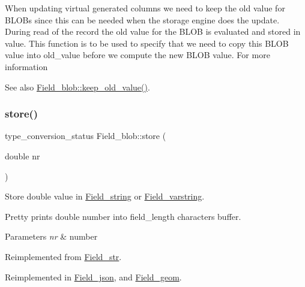 When updating virtual generated columns we need to keep the old \textquotesingle{}value\textquotesingle{} for B\+L\+O\+Bs since this can be needed when the storage engine does the update. During read of the record the old \textquotesingle{}value\textquotesingle{} for the B\+L\+OB is evaluated and stored in \textquotesingle{}value\textquotesingle{}. This function is to be used to specify that we need to copy this B\+L\+OB \textquotesingle{}value\textquotesingle{} into \textquotesingle{}old\+\_\+value\textquotesingle{} before we compute the new B\+L\+OB \textquotesingle{}value\textquotesingle{}. For more information \begin{DoxySeeAlso}{See also}
\mbox{\hyperlink{classField__blob_ac227ff512cca0c54fb2942fffb00e4ca}{Field\+\_\+blob\+::keep\+\_\+old\+\_\+value()}}. 
\end{DoxySeeAlso}
\mbox{\label{classField__blob_a2bc7bea5075f5ebbee1a11c13e37b5b2}} 
\subsubsection{\texorpdfstring{store()}{store()}}
{\footnotesize\ttfamily type\+\_\+conversion\+\_\+status Field\+\_\+blob\+::store (\begin{DoxyParamCaption}\item[{double}]{nr }\end{DoxyParamCaption})\hspace{0.3cm}{\ttfamily [virtual]}}

Store double value in \mbox{\hyperlink{classField__string}{Field\+\_\+string}} or \mbox{\hyperlink{classField__varstring}{Field\+\_\+varstring}}.

Pretty prints double number into field\+\_\+length characters buffer.


\begin{DoxyParams}{Parameters}
{\em nr} & number \\
\hline
\end{DoxyParams}


Reimplemented from \mbox{\hyperlink{classField__str_ad4b48698ff57cae15a2df92f1145b102}{Field\+\_\+str}}.



Reimplemented in \mbox{\hyperlink{classField__json_a2242a237a4e212ba5eadba6f5053df3c}{Field\+\_\+json}}, and \mbox{\hyperlink{classField__geom_aa150c79e0569c74ed2a004ddab0dc6f1}{Field\+\_\+geom}}.

